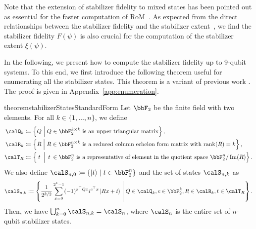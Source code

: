 \documentclass[aps,prx,onecolumn,superscriptaddress,nobibnotes,nofootinbib]{revtex4-2}
\newcommand{\black}[1]{\textcolor{black}{#1}}
\newcommand{\Rank}[1]{\mathrm{rank}\qty(#1)}
\newcommand{\defeq}{\coloneqq}
\newcommand{\relmiddle}[1]{\mathrel{}\middle#1\mathrel{}}
\begin{document}
Note that the extension of stabilizer fidelity to mixed states has been pointed out as essential for the \black{faster} computation of RoM~\cite{Hamaguchi2024handbookquantifying}. As expected from the direct relationships between the stabilizer fidelity and the stabilizer extent~\cite{heimendahlStabilizerExtentNot2021}\cite[Proposition~2]{Bravyi2019simulationofquantum},
we find the stabilizer fidelity $F(\psi)$ is also crucial for the computation of the stabilizer extent $\xi(\psi)$.

In the following, we present how to compute the stabilizer fidelity up to 9-qubit systems.
To this end, we first introduce the following theorem useful for enumerating all the stabilizer states.
This theorem is a variant of previous work
\cite[Theorem 2]{struchalinExperimentalEstimationQuantum2021b}\cite[Section~5]{nestClassicalSimulationQuantum2010}\cite[Theorem 5.(ii)]{dehaeneCliffordGroupStabilizer2003}.
The proof is given in Appendix~\ref{app:enumeration}.
\begin{restatable}{theorem}{stabilizerStatesStandardForm}
  \label{thm:stabilizerStatesStandardForm}
  Let $\bbF_2$ be the finite field with two elements.
  For all $k \in \{1,\dots,n\}$, we define
  \begin{align*}
    \calQ_k & \defeq \left\{ Q \relmiddle| Q \in \bbF_2^{k \times k} \textrm{ is an upper triangular matrix} \right\},                                                                                                       \\
    \calR_k & \defeq \left\{ R \relmiddle| R \in \bbF_2^{n \times k} \textrm{ is a reduced column echelon form matrix with $\Rank{R}=k$} \right\},                                                                           \\
    \calT_R & \defeq \left\{ \mathrlap{\:t}\phantom{Q} \relmiddle| \mathrlap{\:t}\phantom{Q} \in \bbF_2^{n \vphantom{\times k}} \textrm{ is a representative of element in the quotient space $\bbF_2^n / \Im(R)$} \right\}.
  \end{align*}
  We also define $\calS_{n,0} \defeq \left\{ \ket{t} \relmiddle| t \in \bbF_2^{n} \right\}$ and the set of states $\calS_{n,k}$ as
  \begin{equation}\label{eq:stabilizerStateStandardForm}
    \calS_{n,k} \defeq
    \left\{ \frac{1}{2^{k/2}} \sum_{x=0}^{2^k-1}(-1)^{x^\top Q x} i^{c^\top x}\ket{R x+t} \relmiddle| Q \in \calQ_k, c \in \bbF_2^k, R \in \calR_k, t\in \calT_R \right\}.
  \end{equation}
  Then, we have $\bigcup_{k=0}^{n} \calS_{n,k} = \calS_n$, where $\calS_n$ is the entire set of $n$-qubit stabilizer states.
\end{restatable}
\end{document}
